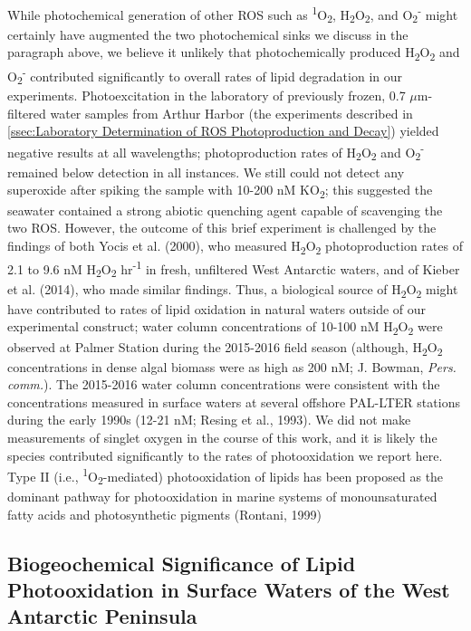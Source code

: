 While photochemical generation of other ROS such as \textsuperscript{1}O\textsubscript{2}, H\textsubscript{2}O\textsubscript{2}, and O\textsubscript{2}\textsuperscript{-} might certainly have augmented the two photochemical sinks we discuss in the paragraph above, we believe it unlikely that photochemically produced H\textsubscript{2}O\textsubscript{2} and O\textsubscript{2}\textsuperscript{-} contributed significantly to overall rates of lipid degradation in our experiments. Photoexcitation in the laboratory of previously frozen, 0.7 $\mu$m-filtered water samples from Arthur Harbor (the experiments described in \autoref{ssec:Laboratory Determination of ROS Photoproduction and Decay}) yielded negative results at all wavelengths; photoproduction rates of H\textsubscript{2}O\textsubscript{2} and O\textsubscript{2}\textsuperscript{-} remained below detection in all instances. We still could not detect any superoxide after spiking the sample with 10-200 nM KO\textsubscript{2}; this suggested the seawater contained a strong abiotic quenching agent capable of scavenging the two ROS. However, the outcome of this brief experiment is challenged by the findings of both Yocis et al. (2000), who measured H\textsubscript{2}O\textsubscript{2} photoproduction rates of 2.1 to 9.6 nM H\textsubscript{2}O\textsubscript{2} hr\textsuperscript{-1} in fresh, unfiltered West Antarctic waters, and of Kieber et al. (2014), who made similar findings. Thus, a biological source of H\textsubscript{2}O\textsubscript{2} might have contributed to rates of lipid oxidation in natural waters outside of our experimental construct; water column concentrations of 10-100 nM H\textsubscript{2}O\textsubscript{2} were observed at Palmer Station during the 2015-2016 field season (although, H\textsubscript{2}O\textsubscript{2} concentrations in dense algal biomass were as high as 200 nM; J. Bowman, \emph{Pers. comm.}). The 2015-2016 water column concentrations were consistent with the concentrations measured in surface waters at several offshore PAL-LTER stations during the early 1990s (12-21 nM; Resing et al., 1993). We did not make measurements of singlet oxygen in the course of this work, and it is likely the species contributed significantly to the rates of photooxidation we report here. Type II (i.e., \textsuperscript{1}O\textsubscript{2}-mediated) photooxidation of lipids has been proposed as the dominant pathway for photooxidation in marine systems of monounsaturated fatty acids and photosynthetic pigments (Rontani, 1999)

\subsection{Biogeochemical Significance of Lipid Photooxidation in Surface Waters of the West Antarctic Peninsula}
